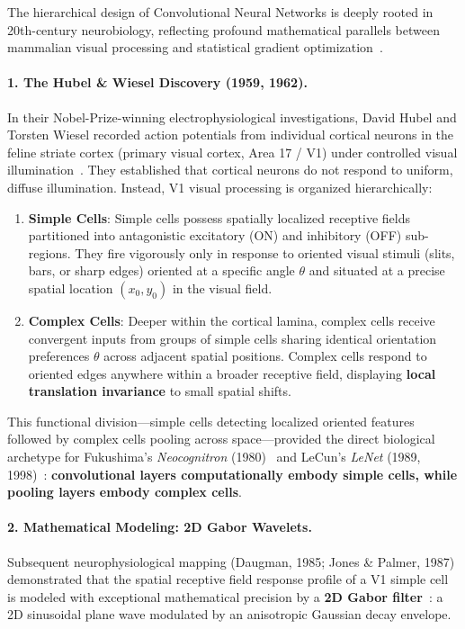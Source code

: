 The hierarchical design of Convolutional Neural Networks is deeply rooted in 20th-century neurobiology, reflecting profound mathematical parallels between mammalian visual processing and statistical gradient optimization~\cite{bishop2024deep}.

\paragraph{1. The Hubel \& Wiesel Discovery (1959, 1962).}
In their Nobel-Prize-winning electrophysiological investigations, David Hubel and Torsten Wiesel recorded action potentials from individual cortical neurons in the feline striate cortex (primary visual cortex, Area 17 / V1) under controlled visual illumination~\cite{hubel1959receptive,hubel1962receptive}. They established that cortical neurons do not respond to uniform, diffuse illumination. Instead, V1 visual processing is organized hierarchically:
\begin{enumerate}[leftmargin=*]
  \item \textbf{Simple Cells}: Simple cells possess spatially localized receptive fields partitioned into antagonistic excitatory (ON) and inhibitory (OFF) sub-regions. They fire vigorously only in response to oriented visual stimuli (slits, bars, or sharp edges) oriented at a specific angle $\theta$ and situated at a precise spatial location $(x_0, y_0)$ in the visual field.
  \item \textbf{Complex Cells}: Deeper within the cortical lamina, complex cells receive convergent inputs from groups of simple cells sharing identical orientation preferences $\theta$ across adjacent spatial positions. Complex cells respond to oriented edges anywhere within a broader receptive field, displaying \textbf{local translation invariance} to small spatial shifts.
\end{enumerate}
This functional division---simple cells detecting localized oriented features followed by complex cells pooling across space---provided the direct biological archetype for Fukushima's \textit{Neocognitron} (1980)~\cite{fukushima1980neocognitron} and LeCun's \textit{LeNet} (1989, 1998)~\cite{lecun1989backpropagation,lecun1998gradient}: \textbf{convolutional layers computationally embody simple cells, while pooling layers embody complex cells}.

\paragraph{2. Mathematical Modeling: 2D Gabor Wavelets.}
Subsequent neurophysiological mapping (Daugman, 1985; Jones \& Palmer, 1987) demonstrated that the spatial receptive field response profile of a V1 simple cell is modeled with exceptional mathematical precision by a \textbf{2D Gabor filter}~\cite{bishop2024deep}: a 2D sinusoidal plane wave modulated by an anisotropic Gaussian decay envelope.

